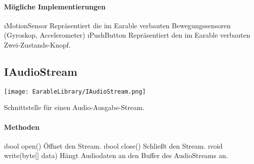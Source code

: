 \documentclass[../entwurf.tex]{subfiles}
\begin{document}
\paragraph{Mögliche Implementierungen}
\begin{itemize}
	\i{MotionSensor} Repräsentiert die im Earable verbauten Bewegungssensoren (Gyroskop, Accelerometer)
	\i{PushButton} Repräsentiert den im Earable verbauten Zwei-Zustands-Knopf.
\end{itemize}

\subsection{IAudioStream}
\begin{center}
	\texttt{[image: EarableLibrary/IAudioStream.png]}
\end{center}
Schnittstelle für einen Audio-Ausgabe-Stream.
\paragraph{Methoden}
\begin{itemize}
	\i{bool open()} Öffnet den Stream.
	\i{bool close()} Schließt den Stream.
	\i{void write(byte[] data)} Hängt Audiodaten an den Buffer des AudioStreams an.
\end{itemize}
\end{document}
